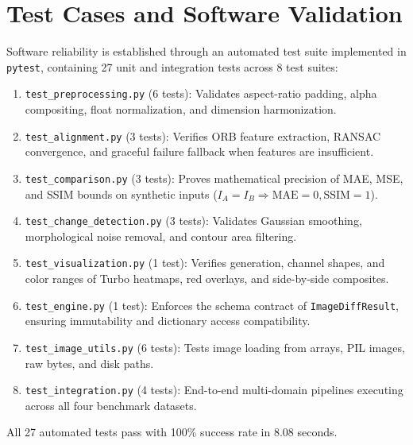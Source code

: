 \documentclass[conference]{IEEEtran}
\begin{document}
\section{Test Cases and Software Validation}
Software reliability is established through an automated test suite implemented in \texttt{pytest}, containing 27 unit and integration tests across 8 test suites:
\begin{enumerate}
    \item \texttt{test\_preprocessing.py} (6 tests): Validates aspect-ratio padding, alpha compositing, float normalization, and dimension harmonization.
    \item \texttt{test\_alignment.py} (3 tests): Verifies ORB feature extraction, RANSAC convergence, and graceful failure fallback when features are insufficient.
    \item \texttt{test\_comparison.py} (3 tests): Proves mathematical precision of MAE, MSE, and SSIM bounds on synthetic inputs ($I_A = I_B \Rightarrow \text{MAE}=0, \text{SSIM}=1$).
    \item \texttt{test\_change\_detection.py} (3 tests): Validates Gaussian smoothing, morphological noise removal, and contour area filtering.
    \item \texttt{test\_visualization.py} (1 test): Verifies generation, channel shapes, and color ranges of Turbo heatmaps, red overlays, and side-by-side composites.
    \item \texttt{test\_engine.py} (1 test): Enforces the schema contract of \texttt{ImageDiffResult}, ensuring immutability and dictionary access compatibility.
    \item \texttt{test\_image\_utils.py} (6 tests): Tests image loading from arrays, PIL images, raw bytes, and disk paths.
    \item \texttt{test\_integration.py} (4 tests): End-to-end multi-domain pipelines executing across all four benchmark datasets.
\end{enumerate}
All 27 automated tests pass with 100\% success rate in 8.08 seconds.
\end{document}
